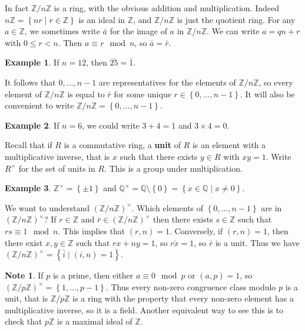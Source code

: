 \documentclass{article}
\newcommand{\Z}{\mathbb{Z}}
\newcommand{\Q}{\mathbb{Q}}
\newcommand{\rb}[1]{\left( #1 \right)}
\newcommand{\cb}[1]{\left\{ #1 \right\}}
\newcommand{\unit}[1]{\rb{\Z / #1\Z}^\times}
\theoremstyle{definition}\newtheorem{definition}{Definition}
\theoremstyle{definition}\newtheorem{remark}[definition]{Remark}
\theoremstyle{definition}\newtheorem*{example}{Example}
\theoremstyle{definition}\newtheorem*{note}{Note}
\begin{document}
In fact $ \Z / n\Z $ is a ring, with the obvious addition and multiplication. Indeed $ n\Z = \cb{nr \mid r \in \Z} $ is an ideal in $ \Z $, and $ \Z / n\Z $ is just the quotient ring. For any $ a \in \Z $, we sometimes write $ \bar{a} $ for the image of $ a $ in $ \Z / n\Z $. We can write $ a = qn + r $ with $ 0 \le r < n $. Then $ a \equiv r \mod n $, so $ \bar{a} = \bar{r} $.

\begin{example}
If $ n = 12 $, then $ \bar{25} = \bar{1} $.
\end{example}

It follows that $ 0, \dots, n - 1 $ are representatives for the elements of $ \Z / n\Z $, so every element of $ \Z / n\Z $ is equal to $ \bar{r} $ for some unique $ r \in \cb{0, \dots, n - 1} $. It will also be convenient to write $ \Z / n\Z = \cb{0, \dots, n - 1} $.

\begin{example}
If $ n = 6 $, we could write $ 3 + 4 = 1 $ and $ 3 \times 4 = 0 $.
\end{example}

Recall that if $ R $ is a commutative ring, a \textbf{unit} of $ R $ is an element with a multiplicative inverse, that is $ x $ such that there exists $ y \in R $ with $ xy = 1 $. Write $ R^\times $ for the set of units in $ R $. This is a group under multiplication.

\begin{example}
$ \Z^\times = \cb{\pm 1} $ and $ \Q^\times = \Q \setminus \cb{0} = \cb{x \in \Q \mid x \ne 0} $.
\end{example}

We want to understand $ \unit{n} $. Which elements of $ \cb{0, \dots, n - 1} $ are in $ \unit{n} $? If $ r \in \Z $ and $ \bar{r} \in \unit{n} $ then there exists $ s \in \Z $ such that $ rs \equiv 1 \mod n $. This implies that $ \rb{r, n} = 1 $. Conversely, if $ \rb{r, n} = 1 $, then there exist $ x, y \in \Z $ such that $ rx + ny = 1 $, so $ \bar{rx} = 1 $, so $ \bar{r} $ is a unit. Thus we have $ \unit{n} = \cb{\bar{i} \mid \rb{i, n} = 1} $.

\begin{note}
If $ p $ is a prime, then either $ a \equiv 0 \mod p $ or $ \rb{a, p} = 1 $, so $ \unit{p} = \cb{1, \dots, p - 1} $. Thus every non-zero congruence class modulo $ p $ is a unit, that is $ \Z / p\Z $ is a ring with the property that every non-zero element has a multiplicative inverse, so it is a field. Another equivalent way to see this is to check that $ p\Z $ is a maximal ideal of $ \Z $.
\end{note}
\end{document}
